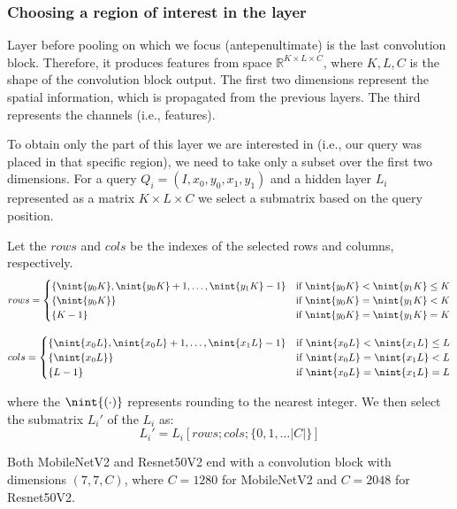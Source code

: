 \subsubsection{Choosing a region of interest in the layer}

Layer before pooling on which we focus (antepenultimate) is the last convolution block. Therefore, it produces features from space $\mathbb{R}^{K\times L \times C}$, where $K, L, C$ is the shape of the convolution block output. The first two dimensions represent the spatial information, which is propagated from the previous layers. The third represents the channels (i.e., features).

To obtain only the part of this layer we are interested in (i.e., our query was placed in that specific region), we need to take only a subset over the first two dimensions. For a query $Q_i = (I, x_0, y_0, x_1, y_1)$ and a hidden layer $L_i$ represented as a matrix $K \times L \times C$ we select a submatrix based on the query position. 

Let the $rows$ and $cols$ be the indexes of the selected rows and columns, respectively. 
$$
    rows =
    \begin{cases}
        \{\nint{y_0 K}, \nint{y_0 K} + 1, \ldots, \nint{y_1 K}-1\} & \text{if } \nint{y_0K} < \nint{y_1K} \leq K \\
        \{\nint{y_0K}\} & \text{if } \nint{y_0K} = \nint{y_1K} < K\\
        \{K-1\} & \text{if } \nint{y_0K} = \nint{y_1K} = K\\
    \end{cases}
$$

$$
    cols =
    \begin{cases}
        \{\nint{x_0 L}, \nint{x_0 L} + 1, \ldots, \nint{x_1 L}-1\} & \text{if } \nint{x_0L} < \nint{x_1L} \leq L \\
        \{\nint{x_0L}\} & \text{if } \nint{x_0L} = \nint{x_1L} < L\\
        \{L-1\} & \text{if } \nint{x_0L} = \nint{x_1L} = L\\
    \end{cases}
$$

where the $\nint{(\cdot)}$ represents rounding to the nearest integer. We then select the submatrix $L_i'$ of the $L_i$ as: 
$$
L_i' = L_i[rows; cols; \{0, 1, \ldots |C|\}]
$$

Both MobileNetV2 and Resnet50V2 end with a convolution block with dimensions $(7,7,C)$, where $C = 1280$ for MobileNetV2 and $C = 2048$ for Resnet50V2. 

